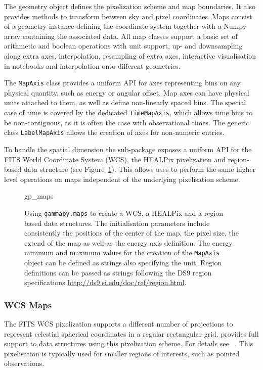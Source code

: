 \documentclass[traditabstract, longauth]{aa}
\newcommand{\code}[1]{\texttt{#1}}
\begin{document}
{The geometry object defines the pixelization scheme and map boundaries. It also
provides methods to transform between sky and pixel coordinates. Maps consist
of a geometry instance defining the coordinate system together with a
Numpy array containing the associated data. All map classes support a basic
set of arithmetic and boolean operations with  unit support, up- and downsampling
along extra axes, interpolation, resampling of extra axes, interactive visualisation
in notebooks and interpolation onto different geometries.

The \code{MapAxis} class provides a uniform API for axes representing
bins on any physical quantity, such as energy or angular offset.
Map axes can have physical units attached to them, as well as define
non-linearly spaced bins. The special case of time is covered by the
dedicated \code{TimeMapAxis}, which allows time bins to be non-contiguous,
as it is often the case with observational times. The generic
class \code{LabelMapAxis} allows the creation of axes for non-numeric entries.

To handle the spatial dimension the sub-package exposes a uniform API for
the FITS World Coordinate System (WCS), the HEALPix pixelization and
region-based data structure (see Figure~\ref{ig*:minted:gp_maps}).
This allows uses to perform the same higher level operations on maps
independent of the underlying pixelisation scheme.

\begin{figure}
	\small
	{gp_maps}

	\caption{
        Using \code{gammapy.maps} to create a WCS, a HEALPix and a region
		based data structures. The initialisation parameters include
        consistently the positions of the center of the map, the pixel
        size, the extend of the map as well as the energy axis definition.
        The energy minimum and maximum values for the creation of the
        \code{MapAxis} object can be defined as strings also specifying the
        unit. Region definitions can be passed as strings following
        the DS9 region specifications \url{http://ds9.si.edu/doc/ref/region.html}.
        }
    \label{ig*:minted:gp_maps}
\end{figure}

\subsubsection{WCS Maps}
The FITS WCS pixelization supports a different number of projections to
represent celestial spherical coordinates in a regular rectangular grid.
\gammapy provides full support to data structures using this pixelization
scheme. For details see ~\cite{Calabretta2002}. This pixelisation
is typically used for smaller regions of interests, such as pointed
observations.


}
\end{document}
